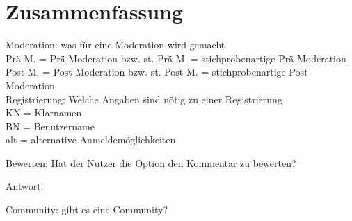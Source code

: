 \section{Zusammenfassung}

Moderation: was für eine Moderation wird gemacht\\
Prä-M. = Prä-Moderation bzw. st. Prä-M. = stichprobenartige Prä-Moderation\\
Post-M. = Post-Moderation bzw. st. Post-M. = stichprobenartige Post-Moderation\\




Registrierung: Welche Angaben sind nötig zu einer Registrierung\\
KN = Klarnamen\\
BN = Benutzername\\
alt = alternative Anmeldemöglichkeiten

Bewerten: Hat der Nutzer die Option den Kommentar zu bewerten?

Antwort: 


Community: gibt es eine Community?

